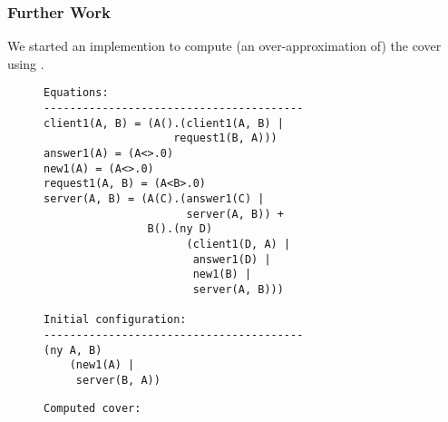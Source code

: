 \documentclass{beamer}
\newcommand{\pical}{$\pi$-calculus}
\begin{document}
\begin{frame}[fragile]
  \frametitle{Further Work}
  We started an implemention to compute (an over-approximation of) the cover using \cite{DBLP:conf/icalp/FinkelG09}.%

\begin{figure}
\begin{minipage}{0.55\linewidth} %
{\scriptsize
\begin{verbatim}
Equations:
----------------------------------------
client1(A, B) = (A().(client1(A, B) |
                    request1(B, A)))
answer1(A) = (A<>.0)
new1(A) = (A<>.0)
request1(A, B) = (A<B>.0)
server(A, B) = (A(C).(answer1(C) |
                      server(A, B)) +
                B().(ny D)
                      (client1(D, A) |
                       answer1(D) |
                       new1(B) |
                       server(A, B)))

Initial configuration:
----------------------------------------
(ny A, B)
    (new1(A) |
     server(B, A))
\end{verbatim}
}
\end{minipage}
\hspace{0.5cm} %
\begin{minipage}{0.35\linewidth}
{\scriptsize
\begin{verbatim}
Computed cover:


\end{verbatim}}
\end{minipage}
\end{figure}
\end{frame}
\end{document}
